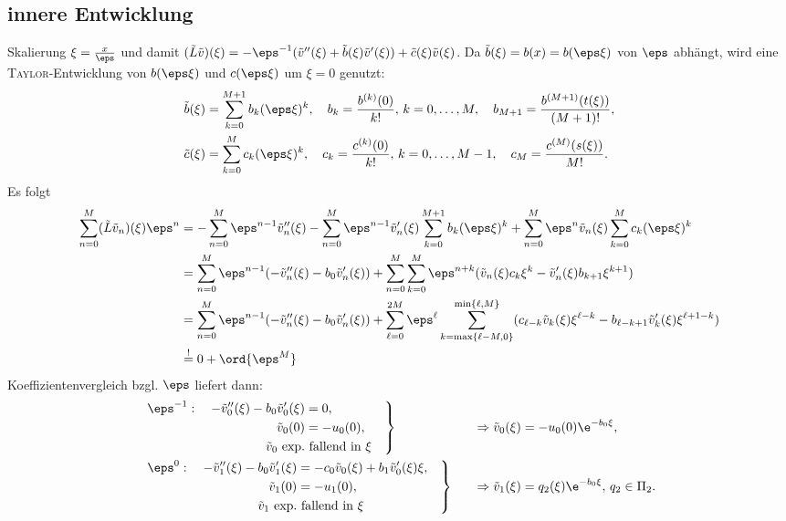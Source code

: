\documentclass[12pt]{article}
\begin{document}
  \subsection*{innere Entwicklung}
  Skalierung $\xi=\frac{x}{\eps}$ und damit $(\tilde L\tilde v)(\xi)=-\eps^{-1}(\tilde v''(\xi)+\tilde b(\xi)\tilde v'(\xi))+\tilde c(\xi)\tilde v(\xi)$.
  Da $\tilde b(\xi)=b(x)=b(\eps\xi)$ von $\eps$ abhängt, wird eine \textsc{Taylor}-Entwicklung von $b(\eps\xi)$ und
  $c(\eps\xi)$ um $\xi=0$ genutzt:
  \begin{align*}
      \tilde b(\xi)
         &%
          =\sum_{k=0}^{M+1}b_k(\eps\xi)^k,\quad
       b_k=\frac{b^{(k)}(0)}{k!},\,k=0,\dots,M,\quad
       b_{M+1}=\frac{b^{(M+1)}(t(\xi))}{(M+1)!},\\
      \tilde c(\xi)
         &%
          =\sum_{k=0}^{M}c_k(\eps\xi)^k,\quad
       c_k=\frac{c^{(k)}(0)}{k!},\,k=0,\dots,M-1,\quad
       c_M=\frac{c^{(M)}(s(\xi))}{M!}.
  \end{align*}
  Es folgt
  \begin{align*}
      \sum_{n=0}^M(\tilde L\tilde v_n)(\xi)\eps^n
         &= -\sum_{n=0}^M\eps^{n-1}\tilde v_n''(\xi)
            -\sum_{n=0}^M\eps^{n-1}\tilde v_n'(\xi)\sum_{k=0}^{M+1}b_k(\eps\xi)^k
            +\sum_{n=0}^M\eps^{n}\tilde v_n(\xi)\sum_{k=0}^{M}c_k(\eps\xi)^k\\
         &= \sum_{n=0}^M\eps^{n-1}(-\tilde v_n''(\xi)-b_0\tilde v_n'(\xi))
            +\sum_{n=0}^M\sum_{k=0}^{M}\eps^{n+k}(\tilde v_n(\xi)c_k\xi^k-\tilde v_n'(\xi)b_{k+1}\xi^{k+1})\\
         &= \sum_{n=0}^M\eps^{n-1}(-\tilde v_n''(\xi)-b_0\tilde v_n'(\xi))
            +\sum_{\ell=0}^{2M}\eps^\ell\sum_{k=\max\{\ell-M,0\}}^{\min\{\ell,M\}}(c_{\ell-k}\tilde v_k(\xi)\xi^{\ell-k}-b_{\ell-k+1}\tilde v_k'(\xi)\xi^{\ell+1-k})\\
         &\stackrel{!}{=}0+\ord{\eps^M}
  \end{align*}
  Koeffizientenvergleich bzgl. $\eps$ liefert dann:
  \begin{align*}
   &\left.
     \begin{aligned}
      \eps^{-1}:\quad-\tilde v''_0(\xi)-b_0\tilde v'_0(\xi) &= 0,\\
                                          \tilde v_0(0)&=-u_0(0),\\
                                          \tilde v_0 \mbox{ exp.}&\mbox{ fallend in $\xi$}
     \end{aligned}\quad
    \right\}&\quad\Rightarrow \tilde v_0(\xi)&=-u_0(0)\e^{-b_0\xi},\\
   &\left.
     \begin{aligned}
      \eps^{0}:\quad-\tilde v''_1(\xi)-b_0\tilde v'_1(\xi) &= -c_0\tilde v_0(\xi)+b_1\tilde v_0'(\xi)\xi,\\
                                          \tilde v_1(0)&=-u_1(0),\\
                                          \tilde v_1 \mbox{ exp.}&\mbox{ fallend in $\xi$}
     \end{aligned}\quad
    \right\}&\quad\Rightarrow \tilde v_1(\xi)&=q_2(\xi)\e^{-b_0\xi},\,q_2\in\Pi_2.
  \end{align*}
\end{document}
